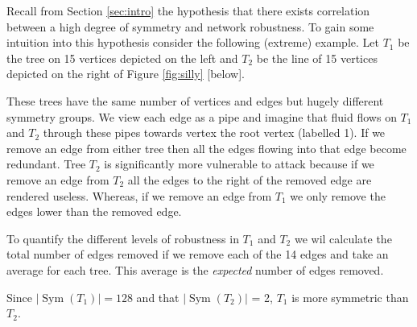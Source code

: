 \documentclass[10pt]{amsart} %
\theoremstyle{definition}
\DeclareMathOperator{\Sym}{Sym}
\begin{document}
Recall from Section \ref{sec:intro} the hypothesis that there exists correlation between a high degree of symmetry and network
robustness. To gain some intuition into this hypothesis consider the following (extreme) example.  Let $T_1$ be the 
tree on 15 vertices depicted on the left and $T_{2}$ be the line of 15 vertices depicted on the right of Figure 
\ref{fig:silly} [below].

These trees have the same number of vertices and edges but hugely different symmetry groups.  We view each edge as a pipe and 
imagine that fluid flows on $T_1$ and $T_2$ through these pipes towards vertex the root vertex (labelled 1).  If we 
remove an edge from either tree then all the edges flowing into that edge become redundant.  Tree $T_2$ is significantly more 
vulnerable to attack because if we remove an edge from $T_2$ all the edges to the right of the removed edge are rendered 
useless.  Whereas, if we remove an edge from $T_1$ we only remove the edges lower than the removed edge.

To quantify the different levels of robustness in $T_1$ and $T_2$ we wil calculate the total number of edges removed 
if we remove each of the 14 edges and take an average for each tree.  This average is the \emph{expected} number of edges removed.  

Since $|\Sym(T_{1})| = 128$ and that $|\Sym(T_{2})|$ = 2, $T_{1}$ is more symmetric than $T_{2}$.  
\end{document}
